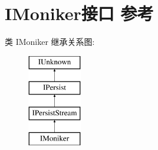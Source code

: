 \hypertarget{interface_i_moniker}{}\section{I\+Moniker接口 参考}
\label{interface_i_moniker}
类 I\+Moniker 继承关系图\+:\begin{figure}[H]
\begin{center}
\leavevmode
\includegraphics[height=4.000000cm]{interface_i_moniker}
\end{center}
\end{figure}
